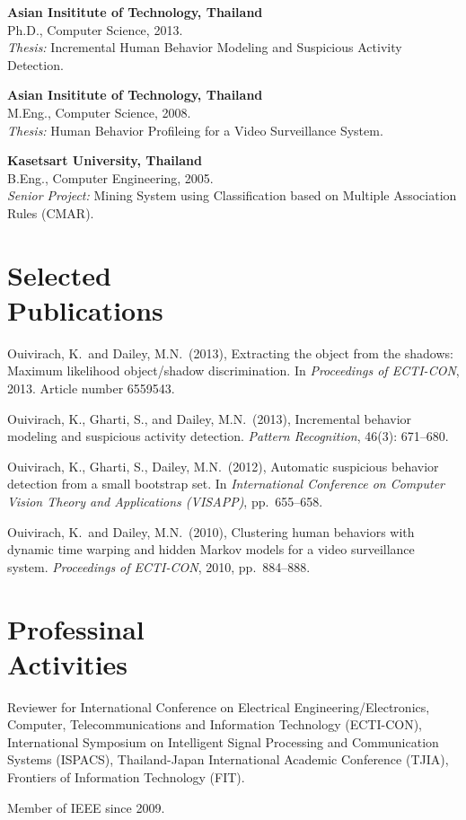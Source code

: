 \documentclass[margin, 10pt]{res}
\begin{document}
\begin{resume}
{\bf Asian Insititute of Technology, Thailand} \\
Ph.D., Computer Science, 2013. \\
{\it Thesis:} Incremental Human Behavior Modeling and Suspicious Activity
Detection.

{\bf Asian Insititute of Technology, Thailand} \\
M.Eng., Computer Science, 2008. \\
{\it Thesis:} Human Behavior Profileing for a Video Surveillance System.

{\bf Kasetsart University, Thailand} \\
B.Eng., Computer Engineering, 2005. \\
{\it Senior Project:} Mining System using Classification based on Multiple
Association Rules (CMAR).

\section{Selected \\ Publications}

Ouivirach, K.\ and Dailey, M.N.\ (2013), Extracting the object from the shadows:
Maximum likelihood object/shadow discrimination. In {\it Proceedings of
ECTI-CON}, 2013. Article number 6559543.

Ouivirach, K., Gharti, S., and Dailey, M.N.\ (2013), Incremental behavior
modeling  and suspicious activity detection. {\it Pattern Recognition}, 46(3):
671--680.

Ouivirach, K., Gharti, S., Dailey, M.N.\ (2012), Automatic suspicious behavior
detection from a small bootstrap set. In {\it International Conference on
Computer Vision Theory and Applications (VISAPP)}, pp.\ 655--658.

Ouivirach, K.\ and Dailey, M.N.\ (2010), Clustering human behaviors with
dynamic time warping and hidden Markov models for a video surveillance system.
{\it Proceedings of ECTI-CON}, 2010, pp.\ 884--888.

\section{Professinal \\ Activities}

Reviewer for International Conference on Electrical Engineering/Electronics,
Computer, Telecommunications and Information Technology (ECTI-CON),
International Symposium on Intelligent Signal Processing and Communication
Systems (ISPACS), Thailand-Japan International Academic Conference (TJIA),
Frontiers of Information Technology (FIT).

Member of IEEE since 2009.

\end{resume}
\end{document}
